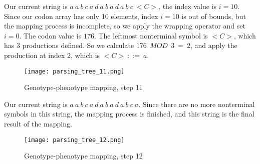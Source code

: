 \clearpage

Our current string is $a\:a\:b\:c\:a\:d\:a\:b\:a\:d\:a\:b\:c\:{<}C{>}$, the index value is $i = 10$. Since our codon array has only 10 elements, index $i = 10$ is out of bounds, but the mapping process is incomplete, so we apply the wrapping operator and set $i = 0$. The codon value is $176$. The leftmost nonterminal symbol is ${<}C{>}$, which has $3$ productions defined. So we calculate $176\:\:MOD\:\:3\:=\:2$, and apply the production at index $2$, which is ${<}C{>}\:::=\:a$.

\begin{figure}[H]
	\centering
	\texttt{[image: parsing\_tree\_11.png]}
	\caption{Genotype-phenotype mapping, step 11}
\end{figure}

\clearpage

Our current string is $a\:a\:b\:c\:a\:d\:a\:b\:a\:d\:a\:b\:c\:a$. Since there are no more nonterminal symbols in this string, the mapping process is finished, and this string is the final result of the mapping.

\begin{figure}[H]
	\centering
	\texttt{[image: parsing\_tree\_12.png]}
	\caption{Genotype-phenotype mapping, step 12}
\end{figure}
